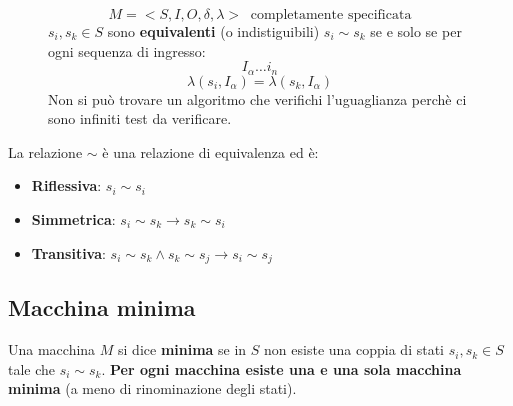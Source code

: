 \documentclass[a4paper]{article}
\theoremstyle{break}
\theoremstyle{break}
\theoremstyle{break}
\theoremstyle{break}
\begin{document}
\begin{figure}[H]
  \begin{definition}
    \[
      M=<S,I,O,\delta,\lambda> \;\;\text{completamente specificata}
    \] 
    \( s_i, s_k \in S \) sono \textbf{equivalenti} (o indistiguibili) \( s_i \sim s_k \) 
    se e solo se per ogni sequenza di ingresso:
    \[
      I_{\alpha} \ldots i_n
    \] 
    \[
      \lambda(s_i,I_{\alpha}) = \lambda(s_k,I_{\alpha})
    \] 
    Non si può trovare un algoritmo che verifichi l'uguaglianza perchè ci sono infiniti
    test da verificare.
  \end{definition}
\end{figure}
La relazione \( \sim \) è una relazione di equivalenza ed è:
\begin{itemize}
  \item \textbf{Riflessiva}: \( s_i \sim s_i \)
  \item \textbf{Simmetrica}: \( s_i \sim s_k \to s_k \sim s_i \) 
  \item \textbf{Transitiva}: \( s_i \sim s_k \wedge s_k \sim s_j \to s_i \sim s_j \) 
\end{itemize}

\subsection{Macchina minima}
Una macchina \( M \) si dice \textbf{minima} se in \( S \)  non esiste una coppia di stati
\( s_i,s_k \in S \) tale che \( s_i \sim s_k \). \textbf{Per ogni macchina esiste una e una
sola macchina minima} (a meno di rinominazione degli stati).
\end{document}
